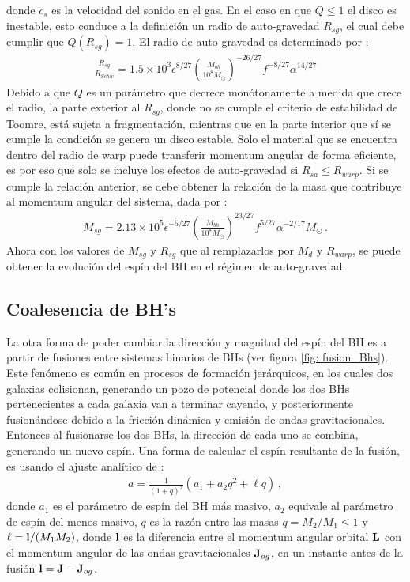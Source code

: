 %
%
donde $c_{s}$ es la velocidad del sonido en el gas. En el caso en que $Q\leq 1$ el disco es inestable, esto conduce a la definición un radio de auto-gravedad $R_{sg}$, el cual debe cumplir que $Q(R_{sg})=1$. El radio de auto-gravedad es determinado por \cite{fanidakis2011}:
\begin{align}
    \frac{R_{sg}}{R_{Schw}}=1.5\times 10^{3}\epsilon^{8/27}\left(\frac{M_{bh}}{10^{8}M_{\odot}} \right)^{-26/27}f^{-8/27}\alpha^{14/27}
\end{align}
%
Debido a que $Q$ es un parámetro que decrece monótonamente a medida que crece el radio, la parte exterior al $R_{sg}$, donde no se cumple el criterio de estabilidad de Toomre, está sujeta a fragmentación, mientras que en la parte interior que sí se cumple la condición se genera un disco estable. Solo el material que se encuentra dentro del radio de warp puede transferir momentum angular de forma eficiente, es por eso que solo se incluye los efectos de auto-gravedad si $R_{sa}\leq R_{warp}$. Si se cumple la relación anterior, se debe obtener la relación de la masa que contribuye al momentum angular del sistema, dada por \cite{fanidakis2011}:
%
\begin{align}
    M_{sg} = 2.13\times 10^{5}\epsilon^{-5/27}\left(\frac{M_{bh}}{10^{8}M_{\odot}} \right)^{23/27}f^{5/27}\alpha^{-2/17}M_{\odot}\,.
\end{align}
%
Ahora con los valores de $M_{sg}$ y $R_{sg}$ que al remplazarlos por $M_{d}$ y $R_{warp}$, se puede obtener la evolución del espín del BH en el régimen de auto-gravedad.


\subsection{Coalesencia de BH's}
\label{subsec:fusion_BHs}
La otra forma de poder cambiar la dirección y magnitud del espín del BH es a partir de fusiones entre  sistemas binarios de BHs (ver figura \ref{fig: fusion_Bhs}). Este fenómeno es común en procesos de formación jerárquicos, en los cuales dos galaxias colisionan, generando un pozo de potencial donde los dos BHs pertenecientes a cada galaxia van a terminar cayendo, y posteriormente fusionándose debido a la fricción dinámica y emisión de ondas gravitacionales. Entonces al fusionarse los dos BHs, la dirección de cada uno se combina, generando un nuevo espín. Una forma de calcular el espín resultante de la fusión, es usando el ajuste analítico de \cite{rezzolla2008}: 
%
\begin{align}
    a = \frac{1}{(1+q)^{2}}(a_{1}+a_{2}q^{2}+\ell q)\,,
\end{align}
%
donde $a_{1}$ es el parámetro de espín del BH más masivo, $a_{2}$ equivale al parámetro de espín del menos masivo, $q$ es la razón entre las masas $q=M_{2}/M_{1}\leq 1$ y $ {\bf{\ell}} = {\bf{l}}/(M_{1}M_{2})$, donde ${\bf{l}}$ es la diferencia entre el momentum angular orbital ${\bf{L}}$ con el momentum angular de las ondas gravitacionales ${\bf{J}}_{og}$, en un instante antes de la fusión ${\bf{l}}={\bf{J}}-{\bf{J}}_{og}$.

